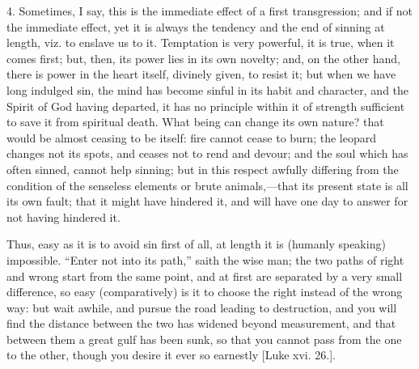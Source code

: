 4. Sometimes, I say, this is the immediate effect of a first
transgression; and if not the immediate effect, yet it is always the
tendency and the end of sinning at length, viz. to enslave us to it.
Temptation is very powerful, it is true, when it comes first; but,
then, its power lies in its own novelty; and, on the other hand, there
is power in the heart itself, divinely given, to resist it; but when
we have long indulged sin, the mind has become sinful in its habit and
character, and the Spirit of God having departed, it has no principle
within it of strength sufficient to save it from spiritual death. What
being can change its own nature? that would be almost ceasing to be
itself: fire cannot cease to burn; the leopard changes not its spots,
and ceases not to rend and devour; and the soul which has often
sinned, cannot help sinning; but in this respect awfully differing
from the condition of the senseless elements or brute animals,—that
its present state is all its own fault; that it might have hindered
it, and will have one day to answer for not having hindered it.

Thus, easy as it is to avoid sin first of all, at length it is
(humanly speaking) impossible. ``Enter not into its path,''
saith the wise man; the two paths of right and wrong start from the
same point, and at first are separated by a very small difference, so
easy (comparatively) is it to choose the right instead of the wrong
way: but wait awhile, and pursue the road leading to destruction, and
you will find the distance between the two has widened beyond
measurement, and that between them a great gulf has been sunk, so that
you cannot pass from the one to the other, though you desire it ever
so earnestly [Luke xvi. 26.].

